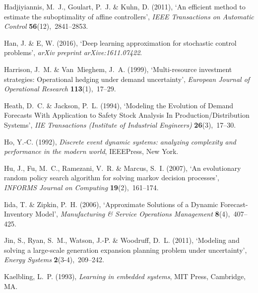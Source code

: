 \documentclass[11pt,oneside,fleqn,reqno,titlepage]{article}
\begin{document}
\begin{thebibliography}{xx}
Hadjiyiannis, M.~J., Goulart, P.~J. \& Kuhn, D.  (2011), `An efficient method
  to estimate the suboptimality of affine controllers', {\em IEEE Transactions
  on Automatic Control} {\bf 56}(12),~2841--2853.

Han, J. \& E, W.  (2016), `Deep learning approximation for stochastic control
  problems', {\em arXiv preprint arXive:1611.07422}.

Harrison, J.~M. \& Van~Mieghem, J.~A.  (1999), `Multi-resource investment
  strategies: Operational hedging under demand uncertainty', {\em European
  Journal of Operational Research} {\bf 113}(1),~17--29.

Heath, D.~C. \& Jackson, P.~L.  (1994), `{Modeling the Evolution of Demand
  Forecasts With Application to Safety Stock Analysis In
  Production/Distribution Systems}', {\em IIE Transactions (Institute of
  Industrial Engineers)} {\bf 26}(3),~17--30.

Ho, Y.-C.  (1992), {\em Discrete event dynamic systems: analyzing complexity
  and performance in the modern world}, IEEEPress, New York.

Hu, J., Fu, M.~C., Ramezani, V.~R. \& Marcus, S.~I.  (2007), `An evolutionary
  random policy search algorithm for solving markov decision processes', {\em
  INFORMS Journal on Computing} {\bf 19}(2),~161--174.

Iida, T. \& Zipkin, P.~H.  (2006), `{Approximate Solutions of a Dynamic
  Forecast-Inventory Model}', {\em Manufacturing \& Service Operations
  Management} {\bf 8}(4),~407--425.

Jin, S., Ryan, S.~M., Watson, J.-P. \& Woodruff, D.~L.  (2011), `Modeling and
  solving a large-scale generation expansion planning problem under
  uncertainty', {\em Energy Systems} {\bf 2}(3-4),~209--242.

Kaelbling, L.~P.  (1993), {\em {Learning in embedded systems}}, MIT Press,
  Cambridge, MA.


\end{thebibliography}
\end{document}
